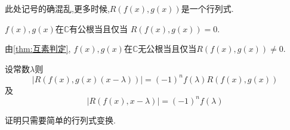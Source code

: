 \begin{red}
\begin{remark}
    此处记号的确混乱,更多时候,$R\left(
        f\left(x\right),g\left(x\right)
    \right)$是一个行列式.
\end{remark}
\end{red}
\begin{formal}
\begin{theorem}[结式判定互素]\label{thm:结式判定互素}
    $f\left(x\right),g\left(x\right)$在$\mathbb{C}$有公根当且仅当
    $R\left(f\left(x\right),g\left(x\right)\right)=0$.
\end{theorem}
\end{formal}
\begin{green}
\begin{corollary}[互素判定]\label{cor:互素判定}由\cref{thm:互素判定},
    $f\left(x\right),g\left(x\right)$在$\mathbb{C}$无公根当且仅当$R\left(
        f\left(x\right),g\left(x\right)
    \right)\neq 0$.
\end{corollary}
\end{green}
\begin{green}
\begin{lemma}[结式的两个变形]\label{lem:结式的两个变形}
    设常数$\lambda$则
    \[
    \left|
        R\left(
            f\left(x\right),g\left(x\right)\left(x-\lambda\right)
        \right)
    \right|=
    \left(-1\right)^nf\left(\lambda\right)R\left(f\left(x\right),g\left(x\right)\right)
    \]及
    \[
    \left|R\left(
        f\left(x\right),x-\lambda
    \right)\right|=\left(-1\right)^nf\left(\lambda\right)
    \]
\end{lemma}
\begin{Proof}
证明只需要简单的行列式变换.
\end{Proof}
\end{green}
